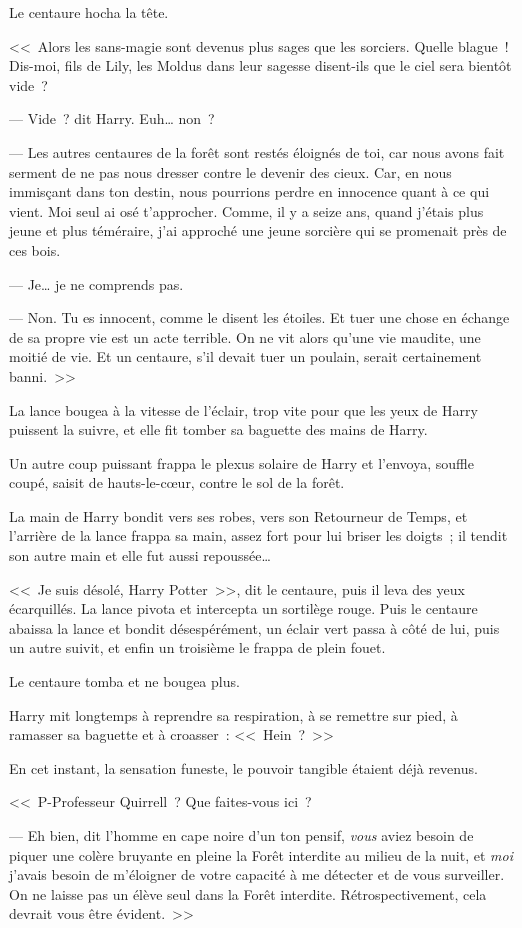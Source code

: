 Le centaure hocha la tête.

<<~Alors les sans-magie sont devenus plus sages que les sorciers. Quelle blague~! Dis-moi, fils de Lily, les Moldus dans leur sagesse disent-ils que le ciel sera bientôt vide~?

--- Vide~? dit Harry. Euh… non~?

--- Les autres centaures de la forêt sont restés éloignés de toi, car nous avons fait serment de ne pas nous dresser contre le devenir des cieux. Car, en nous immisçant dans ton destin, nous pourrions perdre en innocence quant à ce qui vient. Moi seul ai osé t'approcher. Comme, il y a seize ans, quand j'étais plus jeune et plus téméraire, j'ai approché une jeune sorcière qui se promenait près de ces bois.

--- Je… je ne comprends pas.

--- Non. Tu es innocent, comme le disent les étoiles. Et tuer une chose en échange de sa propre vie est un acte terrible. On ne vit alors qu'une vie maudite, une moitié de vie. Et un centaure, s'il devait tuer un poulain, serait certainement banni.~>>

La lance bougea à la vitesse de l'éclair, trop vite pour que les yeux de Harry puissent la suivre, et elle fit tomber sa baguette des mains de Harry.

Un autre coup puissant frappa le plexus solaire de Harry et l'envoya, souffle coupé, saisit de hauts-le-cœur, contre le sol de la forêt.

La main de Harry bondit vers ses robes, vers son Retourneur de Temps, et l'arrière de la lance frappa sa main, assez fort pour lui briser les doigts~; il tendit son autre main et elle fut aussi repoussée…

<<~Je suis désolé, Harry Potter~>>, dit le centaure, puis il leva des yeux écarquillés. La lance pivota et intercepta un sortilège rouge. Puis le centaure abaissa la lance et bondit désespérément, un éclair vert passa à côté de lui, puis un autre suivit, et enfin un troisième le frappa de plein fouet.

Le centaure tomba et ne bougea plus.

Harry mit longtemps à reprendre sa respiration, à se remettre sur pied, à ramasser sa baguette et à croasser~: <<~Hein~?~>>

En cet instant, la sensation funeste, le pouvoir tangible étaient déjà revenus.

<<~P-Professeur Quirrell~? Que faites-vous ici~?

--- Eh bien, dit l'homme en cape noire d'un ton pensif, \emph{vous} aviez besoin de piquer une colère bruyante en pleine la Forêt interdite au milieu de la nuit, et \emph{moi} j'avais besoin de m'éloigner de votre capacité à me détecter et de vous surveiller. On ne laisse pas un élève seul dans la Forêt interdite. Rétrospectivement, cela devrait vous être évident.~>>

